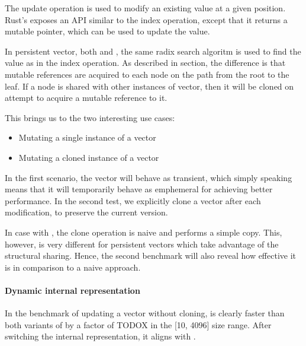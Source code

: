 

The update operation is used to modify an existing value at a given position. Rust's \stdvec{} exposes an API similar to the index operation, except that it returns a mutable pointer, which can be used to update the value. 


In persistent vector, both \rrbvec{} and \pvec{}, the same radix search algoritm is used to find the value as in the index operation. As described in  section, the difference is that mutable references are acquired to each node on the path from the root to the leaf. If a node is shared with other instances of vector, then it will be cloned on attempt to acquire a mutable reference to it. 

This brings us to the two interesting use cases:
\begin{itemize}
    \item Mutating a single instance of a vector
    \item Mutating a cloned instance of a vector
\end{itemize}

In the first scenario, the vector will behave as transient, which simply speaking means that it will temporarily behave as emphemeral for achieving better performance. In the second test, we explicitly clone a vector after each modification, to preserve the current version. 

In case with \stdvec{}, the clone operation is naive and performs a simple copy. This, however, is very different for persistent vectors which take advantage of the structural sharing. Hence, the second benchmark will also reveal how effective it is in comparison to a naive approach. 

\paragraph*{Dynamic internal representation}
In the benchmark of updating a vector without cloning, \pvec{} is clearly faster than both variants of \rrbvec{} by a factor of TODOX in the [10, 4096] size range. After switching the internal representation, it aligns with \rrbvec{}. 

